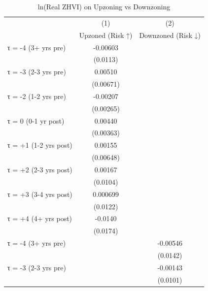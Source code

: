 \begin{table}[htbp]\centering
\def\sym#1{\ifmmode^{#1}\else\(^{#1}\)\fi}
\caption{ln(Real ZHVI) on Upzoning vs Downzoning}
\begin{tabular}{l*{2}{c}}
\hline\hline
                    &\multicolumn{1}{c}{(1)}&\multicolumn{1}{c}{(2)}\\
                    &\multicolumn{1}{c}{Upzoned (Risk ↑)}&\multicolumn{1}{c}{Downzoned (Risk ↓)}\\
\hline
τ = -4 (3+ yrs pre) &    -0.00603         &                     \\
                    &    (0.0113)         &                     \\
[1em]
τ = -3 (2-3 yrs pre)&     0.00510         &                     \\
                    &   (0.00671)         &                     \\
[1em]
τ = -2 (1-2 yrs pre)&    -0.00207         &                     \\
                    &   (0.00265)         &                     \\
[1em]
τ = 0 (0-1 yr post) &     0.00440         &                     \\
                    &   (0.00363)         &                     \\
[1em]
τ = +1 (1-2 yrs post)&     0.00155         &                     \\
                    &   (0.00648)         &                     \\
[1em]
τ = +2 (2-3 yrs post)&     0.00167         &                     \\
                    &    (0.0104)         &                     \\
[1em]
τ = +3 (3-4 yrs post)&    0.000699         &                     \\
                    &    (0.0122)         &                     \\
[1em]
τ = +4 (4+ yrs post)&     -0.0140         &                     \\
                    &    (0.0174)         &                     \\
[1em]
τ = -4 (3+ yrs pre) &                     &    -0.00546         \\
                    &                     &    (0.0142)         \\
[1em]
τ = -3 (2-3 yrs pre)&                     &    -0.00143         \\
                    &                     &    (0.0101)         \\

\end{tabular}
\end{table}
